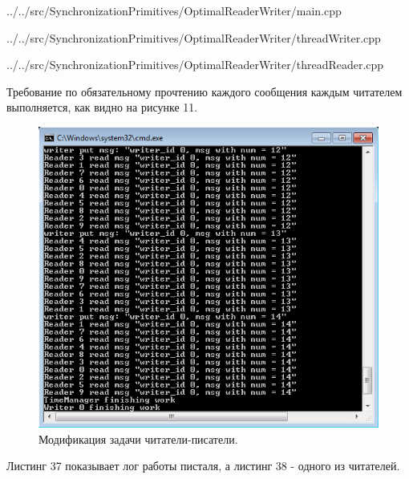 \documentclass[a4paper, 12pt]{article}		%
\begin{document}

{../../src/SynchronizationPrimitives/OptimalReaderWriter/main.cpp}
\newpage


{../../src/SynchronizationPrimitives/OptimalReaderWriter/threadWriter.cpp}
\newpage


{../../src/SynchronizationPrimitives/OptimalReaderWriter/threadReader.cpp}
\newpage

Требование по обязательному прочтению каждого сообщения каждым читателем выполняется, как видно на рисунке 11.

\begin{figure}[h!]
\centering
\includegraphics[scale=0.9]{res/011}
\caption{Модификация задачи читатели-писатели.}
\end{figure}

Листинг 37 показывает лог работы писталя, а листинг 38 - одного из читателей.




\end{document}
